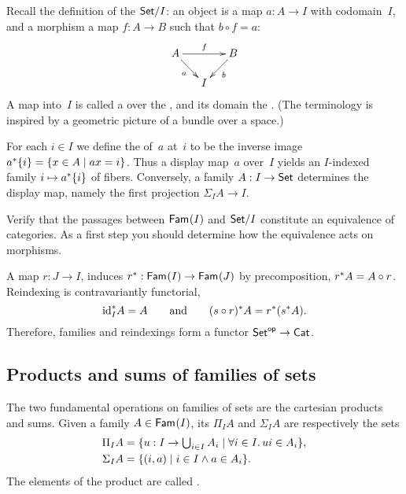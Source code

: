 \begin{exercise}
  Recall the definition of the  $\Set/I$: an object is a map $a : A \to I$ with codomain~$I$, and a morphism a map $f : A \to B$ such that $b \circ f = a$:
  \begin{equation*}
    \xymatrix@-1em{
      {A} \ar[rr]^{f}
      \ar[dr]_{a}
      & &
      {B}
      \ar[dl]^{b}
      \\
      & {I}
    }
  \end{equation*}
  A map into~$I$ is called a  over the , and its domain the . (The terminology is inspired by a geometric picture of a bundle over a space.)

  For each $i \in I$ we define the  of~$a$ at~$i$ to be the inverse image $\invim{a} \set{i} = \set{x \in A \such a x = i}$. Thus a display map~$a$ over~$I$ yields an $I$-indexed family $i \mapsto \invim{a} \set{i}$ of fibers.
  Conversely, a family $A : I \to \Set$ determines the display map, namely the first projection $\Sigma_I A \to I$.

  Verify that the passages between $\Fam{I}$ and $\Set/I$ constitute an equivalence of categories. As a first step you should determine how the equivalence acts on morphisms.
\end{exercise}

A map $r : J \to I$, induces  $\invim{r} : \Fam{I} \to \Fam{J}$ by precomposition, $\invim{r} A = A \circ r$. Reindexing is contravariantly functorial,
%
\begin{equation*}
  \invim{\id[I]} A  = A
  \qquad\text{and}\qquad
  \invim{(s \circ r)} A = \invim{r} (\invim{s} A).
\end{equation*}
%
Therefore, families and reindexings form a functor $\opcat{\Set} \to \Cat$.

\subsection{Products and sums of families of sets}
\label{sec:prod-sums-sets}

The two fundamental operations on families of sets are the cartesian products and sums. 
Given a family $A \in \Fam{I}$, its  $\Pi_I A$ and  $\Sigma_I A$ are respectively the sets
%
\begin{align*}
  \Pi_I A &= 
  \textstyle
  \set{ u : I \to \bigcup_{i \in I} A_i \such \all{i \in I} u i \in A_i }, \\
  \Sigma_I A &= \set{ (i, a) \such i \in I \land a \in A_i }.
\end{align*}
%
The elements of the product are called .

